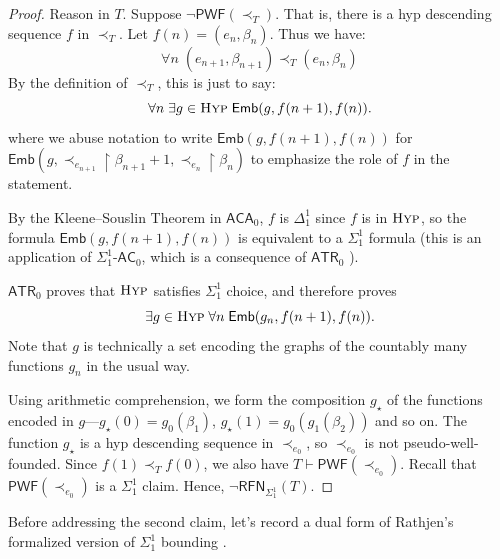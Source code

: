 \documentclass{amsart}
\theoremstyle{definition}
\theoremstyle{remark}
\begin{document}
\begin{proof}
    Reason in $T$. Suppose $\neg \mathsf{PWF}(\prec_T)$. That is, there is a hyp descending sequence $f$ in $\prec_T$. Let $f(n)=(e_n,\beta_n)$. Thus we have:
    $$\forall n \; (e_{n+1},\beta_{n+1})\prec_T (e_n,\beta_n)$$
    By the definition of $\prec_T$, this is just to say:
    $$\forall n \; \exists g \in \textsc{Hyp} \; \mathsf{Emb}(g,f(n+1),f(n)).$$
    where we abuse notation to write $\mathsf{Emb}(g,f(n+1),f(n))$ for $\mathsf{Emb}(g,\prec_{e_{n+1}}\upharpoonright \beta_{n+1}+1,\prec_{e_{n}}\upharpoonright \beta_{n})$ to emphasize the role of $f$ in the statement.

    By the Kleene--Souslin Theorem \cite[Theorem VIII.3.19]{simpson2009subsystems} in $\mathsf{ACA}_0$, $f$ is $\Delta^1_1$ since $f$ is in $\textsc{Hyp}$, so the formula $\mathsf{Emb}(g,f(n+1),f(n))$ is equivalent to a $\Sigma^1_1$ formula (this is an application of $\Sigma^1_1\text{-}\mathsf{AC}_0$, which is a consequence of $\mathsf{ATR}_0$ \cite[Theorem V.8.3]{simpson2009subsystems}).

    $\mathsf{ATR}_0$ proves that $\textsc{Hyp}$ satisfies $\Sigma^1_1$ choice, and therefore proves
    $$\exists g\in\textsc{Hyp}  \; \forall n \; \mathsf{Emb}(g_n,f(n+1),f(n)).$$
    Note that $g$ is technically a set encoding the graphs of the countably many functions $g_n$ in the usual way.

    Using arithmetic comprehension, we form the composition $g_\star$ of the functions encoded in $g$---$g_\star(0)=g_0(\beta_1)$, $g_\star(1)=g_0(g_1(\beta_2))$ and so on. The function $g_\star$ is a hyp descending sequence in $\prec_{e_0}$, so $\prec_{e_0}$ is not pseudo-well-founded. Since $f(1)\prec_T f(0)$, we also have $T\vdash\mathsf{PWF}(\prec_{e_0})$. Recall that $\mathsf{PWF}(\prec_{e_0})$ is a $\Sigma^1_1$ claim. Hence, $\neg \mathsf{RFN}_{\Sigma^1_1}(T)$.
\end{proof}




Before addressing the second claim, let's record a dual form of Rathjen's formalized version of $\Sigma^1_1$ bounding \cite[Lemma 1.1]{rathjen1991role}.
\end{document}
